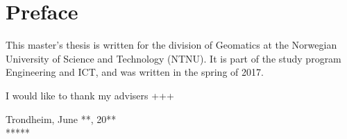 \chapter*{Preface}
%

This master's thesis is written for the division of Geomatics at the Norwegian University of Science and Technology (NTNU). It is part of the study program Engineering and ICT, and was written in the spring of 2017. 

I would like to thank my advisers +++
\newline
\newline

\begin{center}
	
	Trondheim, June **, 20**\\
	*****
	
\end{center}



\begin{figure}
\centering
\end{figure}
